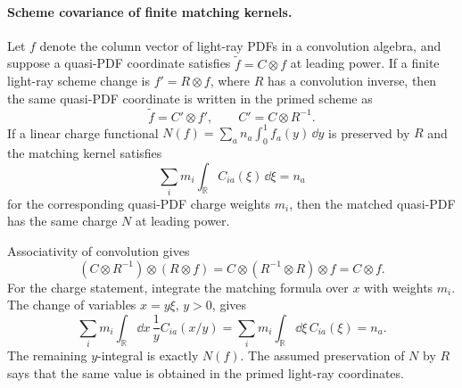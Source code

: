 \paragraph{Scheme covariance of finite matching kernels.}
Let \(f\) denote the column vector of light-ray PDFs in a convolution algebra,
and suppose a quasi-PDF coordinate satisfies
\(\widetilde f=C\otimes f\) at leading power.  If a finite light-ray scheme
change is \(f'=R\otimes f\), where \(R\) has a convolution inverse, then the
same quasi-PDF coordinate is written in the primed scheme as
\[
  \widetilde f=C'\otimes f',
  \qquad
  C'=C\otimes R^{-1}.
\]
If a linear charge functional \(N(f)=\sum_a n_a\int_0^1 f_a(y)\,\dd y\) is
preserved by \(R\) and the matching kernel satisfies
\[
  \sum_i m_i\int_{\mathbb R} C_{ia}(\xi)\,\dd\xi=n_a
\]
for the corresponding quasi-PDF charge weights \(m_i\), then the matched
quasi-PDF has the same charge \(N\) at leading power.

Associativity of convolution gives
\[
  (C\otimes R^{-1})\otimes(R\otimes f)
  =
  C\otimes(R^{-1}\otimes R)\otimes f
  =
  C\otimes f.
\]
For the charge statement, integrate the matching formula over \(x\) with
weights \(m_i\).  The change of variables \(x=y\xi\), \(y>0\), gives
\[
  \sum_i m_i\int_{\mathbb R}\dd x\,\frac1y C_{ia}(x/y)
  =
  \sum_i m_i\int_{\mathbb R}\dd\xi\,C_{ia}(\xi)
  =
  n_a.
\]
The remaining \(y\)-integral is exactly \(N(f)\).  The assumed preservation of
\(N\) by \(R\) says that the same value is obtained in the primed light-ray
coordinates.

